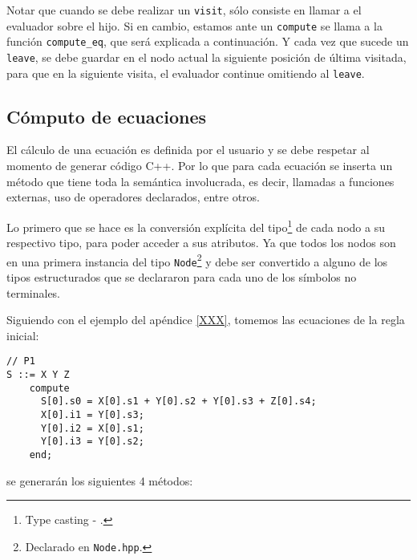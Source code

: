 Notar que cuando se debe realizar un \texttt{visit}, sólo consiste en llamar a el evaluador sobre el hijo. Si en cambio, estamos ante un \texttt{compute} se llama a la función \texttt{compute\_eq}, que será explicada a continuación. Y cada vez que sucede un \texttt{leave}, se debe guardar en el nodo actual la siguiente posición de última visitada, para que en la siguiente visita, el evaluador continue omitiendo al \texttt{leave}.

\subsection{Cómputo de ecuaciones}

El cálculo de una ecuación es definida por el usuario y se debe respetar al momento de generar código C++. Por lo que para cada ecuación se inserta un método que tiene toda la semántica involucrada, es decir, llamadas a funciones externas, uso de operadores declarados, entre otros.

Lo primero que se hace es la conversión explícita del tipo\footnote{Type casting - .} de cada nodo a su respectivo tipo, para poder acceder a sus atributos. Ya que todos los nodos son en una primera instancia del tipo \texttt{Node}\footnote{Declarado en \texttt{Node.hpp}.} y debe ser convertido a alguno de los tipos estructurados que se declararon para cada uno de los símbolos no terminales.

Siguiendo con el ejemplo del apéndice \ref{XXX}, tomemos las ecuaciones de la regla inicial:

\vspace*{0.2cm}
\begin{lstlisting}[language=specmag, basicstyle=\scriptsize, columns=fullflexible, linewidth=8cm]
// P1
S ::= X Y Z
    compute        
      S[0].s0 = X[0].s1 + Y[0].s2 + Y[0].s3 + Z[0].s4;
      X[0].i1 = Y[0].s3;
      Y[0].i2 = X[0].s1;
      Y[0].i3 = Y[0].s2;
    end;
\end{lstlisting}
\vspace*{0.2cm}

se generarán los siguientes 4 métodos:

